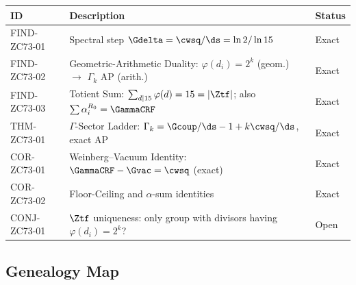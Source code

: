\documentclass[12pt, a4paper]{article}
\begin{document}
\begin{formalbox}[title={Atomic Registry --- ZC73}]
\begin{center}
\renewcommand{\arraystretch}{1.3}\small
\begin{tabular}{lp{8.5cm}l}
\toprule
ID & Description & Status \\
\midrule
FIND-ZC73-01
  & Spectral step $\Gdelta = \cwsq/\ds = \ln2/\ln15$
  & Exact \\[3pt]
FIND-ZC73-02
  & Geometric-Arithmetic Duality:
    $\varphi(d_i)=2^k$ (geom.) $\to$ $\Gamma_k$ AP (arith.)
  & Exact \\[3pt]
FIND-ZC73-03
  & Totient Sum: $\sum_{d|15}\varphi(d) = 15 = |\Ztf|$;
    also $\sum \alpha_i^{R_0} = \GammaCRF$
  & Exact \\[3pt]
THM-ZC73-01
  & $\Gamma$-Sector Ladder:
    $\Gamma_k = \Gcoup/\ds - 1 + k\cwsq/\ds$, exact AP
  & Exact \\[3pt]
COR-ZC73-01
  & Weinberg--Vacuum Identity:
    $\GammaCRF - \Gvac = \cwsq$ (exact)
  & Exact \\[3pt]
COR-ZC73-02
  & Floor-Ceiling and $\alpha$-sum identities
  & Exact \\[3pt]
CONJ-ZC73-01
  & $\Ztf$ uniqueness: only group with divisors having
    $\varphi(d_i) = 2^k$?
  & Open \\
\bottomrule
\end{tabular}
\end{center}
\end{formalbox}

\subsection{Genealogy Map}
\label{sec:genealogy}
\end{document}
